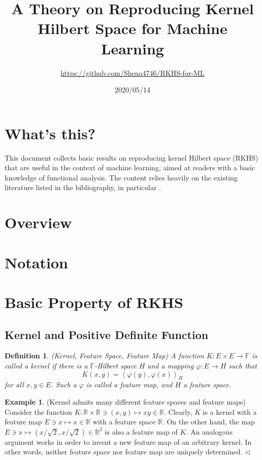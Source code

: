\documentclass[a4paper,12pt]{article}
\title{A Theory on Reproducing Kernel Hilbert Space for Machine Learning}
\author{\url{https://github.com/Shena4746/RKHS-for-ML}}
\date{2020/05/14}
\newtheorem{dfn}[thm]{Definition}
\theoremstyle{remark}
\theoremstyle{definition}
\theoremstyle{definition}
\newtheorem{ex}[thm]{Example}
\theoremstyle{definition}
\newcommand{\ip}[2]{\left<#1, #2 \right>}
\newcommand{\fin}{\hfill \( \triangleleft \) }
\begin{document}
\maketitle
\section*{What's this?}
This document collects basic results on reproducing kernel Hilbert space (RKHS) that are useful in the context of machine learning, aimed at readers with a basic knowledge of functional analysis. The content relies heavily on the existing literature listed in the bibliography, in particular \cite{Berlinet:RKHS} \cite{Christmann-Steinwart:SVM}.
\cite{Cucker-Zhou:Learning-Theory}
\cite{Paulsen-Raghupathi:Intro-RKHS}
\cite{Schlkopf-Smola:Learning-with-kernels}

\section*{Overview}

\tableofcontents
\clearpage
\section*{Notation}
\section{Basic Property of RKHS}
\subsection{Kernel and Positive Definite Function}
\begin{dfn} (Kernel, Feature Space, Feature Map)
	A function \( K:E \times E \to \mathbb{F} \) is called a kernel if there is a \( \mathbb{F}\)-Hilbert space \( H \) and a mapping \( \varphi:E \to H \) such that
	\begin{equation*}
		K(x,y) = \ip{\varphi(y)}{\varphi(x)}_H
	\end{equation*}
	for all \( x,y \in E \).
	Such a \( \varphi \) is called a feature map, and \( H \) a feature space.
\end{dfn}

\begin{ex}(Kernel admits many different feature spaces and feature maps)
	Consider the function \( K:\mathbb{R} \times \mathbb{R} \ni (x,y) \mapsto xy \in \mathbb{R} \). Clearly, \( K \) is a kernel with a feature map \( E \ni x \mapsto x \in \mathbb{R} \) with a feature space \( \mathbb{R} \). On the other hand, the map \( E \ni x \mapsto (x / \sqrt{2}, x / \sqrt{2}) \in \mathbb{R}^2 \) is also a feature map of \( K \). An analogous argument works in order to invent a new feature map of an arbitrary kernel. In other words, neither feature space nor feature map are uniquely determined.
	\fin\end{ex}
\end{document}
